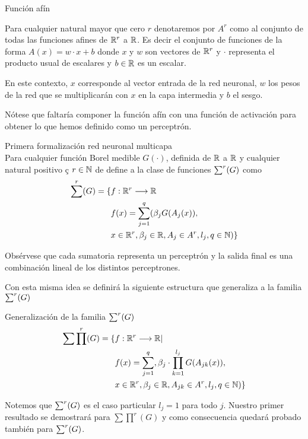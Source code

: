 \begin{definicion} Función afín

    Para cualquier natural mayor que cero $r$  denotaremos por $A^r$ como al conjunto de todas 
    las funciones afines de $\mathbb{R}^r$ a $\mathbb{R}$. Es decir el conjunto de funciones de la forma 
    $A(x) = w \cdot x + b$ donde $x$ y $w$ son vectores de $\mathbb{R}^r$ y $\cdot$ representa el producto 
    usual de escalares y $b \in \mathbb{R}$ es un escalar.  
    
\end{definicion}  

En este contexto, $x$ corresponde al vector entrada de la red neuronal, $w$ los pesos de la red
que se multiplicarán con $x$ en la capa intermedia y $b$ el sesgo. 

Nótese que faltaría componer la función afín con una función de activación para obtener lo que hemos definido 
como un perceptrón. 

\begin{definicion} Primera formalización red neuronal multicapa \\
    Para cualquier función Borel medible $G(\cdot)$, definida de $\mathbb{R}$ a $\mathbb{R}$ y cualquier natural positivo ç
    $r \in \mathbb{N}$ de define a la clase de funciones $\sum ^r (G)$ como 
    \begin{equation}
        \begin{split}
        \sum ^r (G) = 
        \{ 
            & f: \mathbb{R} ^r \longrightarrow \mathbb{R} \\
            &f(x)=\sum_{j = 1} ^q (
            \beta_j G(A_{j}(x)), \\
            & x  \in \mathbb{R} ^r, \beta_j \in \mathbb{R}, A_{j}\in A^r, l_j,q \in \mathbb{N}
            )
        \}
        \end{split}
    \end{equation}
\end{definicion}


Obsérvese que cada sumatoria representa un perceptrón y la salida final 
es una combinación lineal de los distintos perceptrones. 

Con esta misma idea se definirá la siguiente estructura que generaliza a la familia $\sum ^r (G)$  
   
\begin{definicion} Generalización de la familia $\sum ^r (G)$ \\
    
    \begin{equation} 
        \begin{split}
        \sum \prod^r(G) = \{ 
        &f: \mathbb{R}^r \longrightarrow \mathbb{R} | \\
        & f(x) = \sum_{j = 1} ^q , \beta_j \cdot \prod_{k=1}^{l_j}
        G(A_{jk}(x)), \\
        &x  \in \mathbb{R}^r, \beta_j \in \mathbb{R}, A_{jk}\in A^r, l_j,q \in \mathbb{N}
        )
        \}
    \end{split}
    \end{equation}  

    Notemos que $\sum ^r (G)$ es el caso particular $l_j = 1$ para todo $j$. Nuestro primer
    resultado se demostrará para $\sum \prod^r(G)$ y como consecuencia quedará probado
    también para $\sum ^r (G)$. 
\end{definicion}


